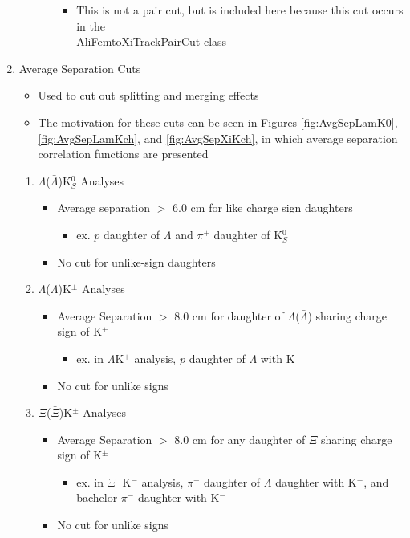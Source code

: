 \documentclass[../AnalysisNoteJBuxton.tex]{subfiles}
\begin{document}
\begin{enumerate}
\begin{enumerate}
\begin{itemize}
   \begin{itemize}
    \item This is not a pair cut, but is included here because this cut occurs in the \\AliFemtoXiTrackPairCut class
   \end{itemize}
  \end{itemize}  
 \end{enumerate}
 \item Average Separation Cuts
 \begin{itemize}
  \item Used to cut out splitting and merging effects
  \item The motivation for these cuts can be seen in Figures \ref{fig:AvgSepLamK0}, \ref{fig:AvgSepLamKch}, and \ref{fig:AvgSepXiKch}, in which average separation correlation functions are presented
 \end{itemize}
 \begin{enumerate}
  \item $\Lambda$($\bar{\Lambda}$)K$^{0}_{S}$ Analyses
  \begin{itemize}
   \item Average separation $>$ 6.0 cm for like charge sign daughters
   \begin{itemize}
    \item ex. $p$ daughter of $\Lambda$ and $\pi^{+}$ daughter of K$^{0}_{S}$
   \end{itemize}
   \item No cut for unlike-sign daughters
  \end{itemize}
  \item $\Lambda$($\bar{\Lambda}$)K$^{\pm}$ Analyses
  \begin{itemize}
   \item Average Separation $>$ 8.0 cm for daughter of $\Lambda$($\bar{\Lambda}$) sharing charge sign of K$^{\pm}$
   \begin{itemize}
    \item ex. in $\Lambda$K$^{+}$ analysis, $p$ daughter of $\Lambda$ with K$^{+}$
   \end{itemize}
   \item No cut for unlike signs
  \end{itemize}
  \item $\Xi$($\bar{\Xi}$)K$^{\pm}$ Analyses
  \begin{itemize}
   \item Average Separation $>$ 8.0 cm for any daughter of $\Xi$ sharing charge sign of K$^{\pm}$
   \begin{itemize}
    \item ex. in $\Xi^{-}$K$^{-}$ analysis, $\pi^{-}$ daughter of $\Lambda$ daughter with K$^{-}$, and bachelor $\pi^{-}$ daughter with K$^{-}$
   \end{itemize}
   \item No cut for unlike signs
  \end{itemize}  
 \end{enumerate}
\end{enumerate}
\end{document}
